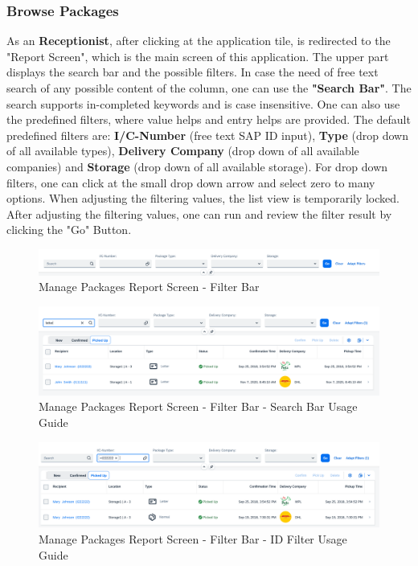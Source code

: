 \subsubsection{Browse Packages}
As an \textbf{Receptionist}, after clicking at the application tile, is redirected to the "Report Screen", which is the main screen of this application. 
The upper part displays the search bar and the possible filters. 
In case the need of free text search of any possible content of the column, one can use the \textbf{"Search Bar"}. The search supports in-completed keywords and is case insensitive. One can also use the predefined filters, where value helps and entry helps are provided.
The default predefined filters are: \textbf{I/C-Number} (free text SAP ID input), \textbf{Type} (drop down of all available types), \textbf{Delivery Company} (drop down of all available companies) and \textbf{Storage} (drop down of all available storage). 
For drop down filters, one can click at the small drop down arrow and select zero to many options. When adjusting the filtering values, the list view is temporarily locked. After adjusting the filtering values, one can run and review the filter result by clicking the "Go" Button.

\begin{figure}[H]
	\centering
	\includegraphics[width=1\linewidth]{images/user_doc/managePack/ReportScreen/browse/FilterBar.png}
	\caption{Manage Packages Report Screen - Filter Bar}
	\label{fig:MPFIlterBar}
\end{figure}

\begin{figure}[H]
	\centering
	\includegraphics[width=1\linewidth]{images/user_doc/managePack/ReportScreen/browse/defaultSearchBarUsage.png}
	\caption{Manage Packages Report Screen - Filter Bar - Search Bar Usage Guide}
	\label{fig:MPSearchBar}
\end{figure}

\begin{figure}[H]
	\centering
	\includegraphics[width=1\linewidth]{images/user_doc/managePack/ReportScreen/browse/defaultFreeTextIdUsage.png}
	\caption{Manage Packages Report Screen - Filter Bar - ID Filter Usage Guide}
	\label{fig:MPIDFIlter}
\end{figure}

